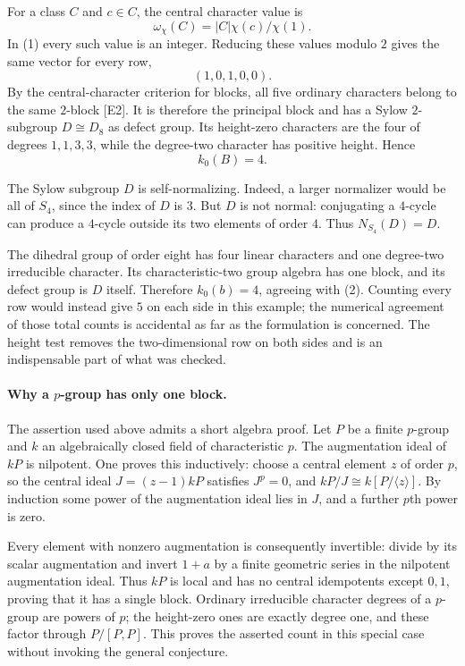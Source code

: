 \documentclass[11pt]{article}
\begin{document}
For a class $C$ and $c\in C$, the central character value is
\[
 \omega_\chi(C)=|C|\chi(c)/\chi(1).
\]
In (1) every such value is an integer. Reducing these values modulo $2$ gives the same vector for every row,
\[
 (1,0,1,0,0).
\]
By the central-character criterion for blocks, all five ordinary characters belong to the same $2$-block [E2]. It is therefore the principal block and has a Sylow $2$-subgroup $D\cong D_8$ as defect group. Its height-zero characters are the four of degrees $1,1,3,3$, while the degree-two character has positive height. Hence
\[
 k_0(B)=4.                                                   \tag{2}
\]

The Sylow subgroup $D$ is self-normalizing. Indeed, a larger normalizer would be all of $S_4$, since the index of $D$ is $3$. But $D$ is not normal: conjugating a $4$-cycle can produce a $4$-cycle outside its two elements of order $4$. Thus $N_{S_4}(D)=D$.

The dihedral group of order eight has four linear characters and one degree-two irreducible character. Its characteristic-two group algebra has one block, and its defect group is $D$ itself. Therefore $k_0(b)=4$, agreeing with (2). Counting every row would instead give $5$ on each side in this example; the numerical agreement of those total counts is accidental as far as the formulation is concerned. The height test removes the two-dimensional row on both sides and is an indispensable part of what was checked.

\paragraph{Why a $p$-group has only one block.}
The assertion used above admits a short algebra proof. Let $P$ be a finite $p$-group and $k$ an algebraically closed field of characteristic $p$. The augmentation ideal of $kP$ is nilpotent. One proves this inductively: choose a central element $z$ of order $p$, so the central ideal $J=(z-1)kP$ satisfies $J^p=0$, and $kP/J\cong k[P/\langle z\rangle]$. By induction some power of the augmentation ideal lies in $J$, and a further $p$th power is zero.

Every element with nonzero augmentation is consequently invertible: divide by its scalar augmentation and invert $1+a$ by a finite geometric series in the nilpotent augmentation ideal. Thus $kP$ is local and has no central idempotents except $0,1$, proving that it has a single block. Ordinary irreducible character degrees of a $p$-group are powers of $p$; the height-zero ones are exactly degree one, and these factor through $P/[P,P]$. This proves the asserted count in this special case without invoking the general conjecture.
\end{document}
